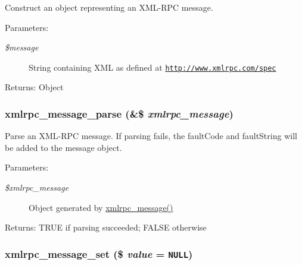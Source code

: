 Construct an object representing an XML-RPC message.

\begin{Desc}
\item[Parameters:]
\begin{description}
\item[{\em \$message}]String containing XML as defined at \href{http://www.xmlrpc.com/spec}{\tt http://www.xmlrpc.com/spec} \end{description}
\end{Desc}
\begin{Desc}
\item[Returns:]Object \end{Desc}
\hypertarget{xmlrpc_8inc_9dbb44df348197e48e26ce7c6e0c85a4}{
\subsubsection[{xmlrpc\_\-message\_\-parse}]{\setlength{\rightskip}{0pt plus 5cm}xmlrpc\_\-message\_\-parse (\&\$ {\em xmlrpc\_\-message})}}
\label{xmlrpc_8inc_9dbb44df348197e48e26ce7c6e0c85a4}


Parse an XML-RPC message. If parsing fails, the faultCode and faultString will be added to the message object.

\begin{Desc}
\item[Parameters:]
\begin{description}
\item[{\em \$xmlrpc\_\-message}]Object generated by \hyperlink{xmlrpc_8inc_623f37020bfae3dec50facefc4cdcdac}{xmlrpc\_\-message()} \end{description}
\end{Desc}
\begin{Desc}
\item[Returns:]TRUE if parsing succeeded; FALSE otherwise \end{Desc}
\hypertarget{xmlrpc_8inc_82e3428ca6ed8e4d1ddc377fbc77d8dc}{
\subsubsection[{xmlrpc\_\-message\_\-set}]{\setlength{\rightskip}{0pt plus 5cm}xmlrpc\_\-message\_\-set (\$ {\em value} = {\tt NULL})}}
\label{xmlrpc_8inc_82e3428ca6ed8e4d1ddc377fbc77d8dc}


